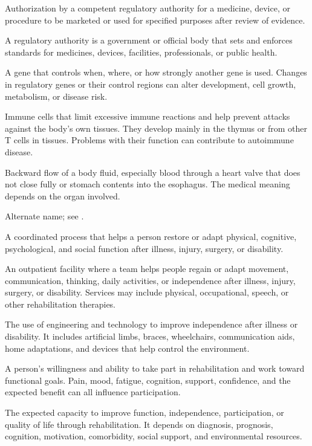  Authorization by a competent regulatory authority for a medicine, device, or procedure to be marketed or used for specified purposes after review of evidence.

 A regulatory authority is a government or official body that sets and enforces standards for medicines, devices, facilities, professionals, or public health.

 A gene that controls when, where, or how strongly another gene is used. Changes in regulatory genes or their control regions can alter development, cell growth, metabolism, or disease risk.

 Immune cells that limit excessive immune reactions and help prevent attacks against the body’s own tissues. They develop mainly in the thymus or from other T cells in tissues. Problems with their function can contribute to autoimmune disease.

 Backward flow of a body fluid, especially blood through a heart valve that does not close fully or stomach contents into the esophagus. The medical meaning depends on the organ involved.

 Alternate name; see .

 A coordinated process that helps a person restore or adapt physical, cognitive, psychological, and social
function after illness, injury, surgery, or disability.

 An outpatient facility where a team helps people regain or adapt movement, communication, thinking, daily activities, or independence after illness, injury, surgery, or disability. Services may include physical, occupational, speech, or other rehabilitation therapies.

 The use of engineering and technology to improve independence after illness or disability. It includes artificial limbs, braces, wheelchairs, communication aids, home adaptations, and devices that help control the environment.

 A person’s willingness and ability to take part in rehabilitation and work toward functional goals. Pain, mood, fatigue, cognition, support, confidence, and the expected benefit can all influence participation.

 The expected capacity to improve function, independence, participation, or quality of
life through rehabilitation. It depends on diagnosis, prognosis, cognition, motivation,
comorbidity, social support, and environmental resources.

